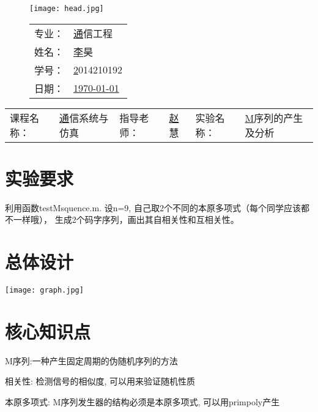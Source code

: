 \documentclass{zjureport}
\newcommand{\major}{通信工程}
\newcommand{\name}{李昊}
\newcommand{\stuid}{2014210192}
\newcommand{\newdate}{\today}
\newcommand{\course}{通信系统与仿真}
\newcommand{\tutor}{赵慧}
\newcommand{\newtitle}{M序列的产生及分析}
\begin{document}
\thispagestyle{empty}
\begin{figure}[h]
  \begin{minipage}{0.6\linewidth}
    \centerline{\texttt{[image: head.jpg]}}
  \end{minipage}
  \hfill
  \begin{minipage}{.4\linewidth}
    \raggedleft
    \begin{tabular*}{.8\linewidth}{ll}
      专业： & \underline\major   \\
      姓名： & \underline\name    \\
      学号： & \underline\stuid   \\
      日期： & \underline\newdate \\
    \end{tabular*}
  \end{minipage}
\end{figure}

\begin{table}[!htbp]
  \centering
  \begin{tabular*}{\linewidth}{llllll}
    课程名称： & \underline\course   & 指导老师： & \underline\tutor   & 实验名称：       &  \underline\newtitle\\
  \end{tabular*}
\end{table}


\section{实验要求}
	利用函数testMsquence.m.      设n=9, 自己取2个不同的本原多项式（每个同学应该都不一样哦）， 生成2个码字序列，画出其自相关性和互相关性。
\section{总体设计}
        \texttt{[image: graph.jpg]}
\section{核心知识点}
	\begin{clause}
	\item M序列:一种产生固定周期的伪随机序列的方法
	\item 相关性: 检测信号的相似度, 可以用来验证随机性质
	\item 本原多项式: M序列发生器的结构必须是本原多项式, 可以用primpoly产生
	 \end{clause}
\end{document}
